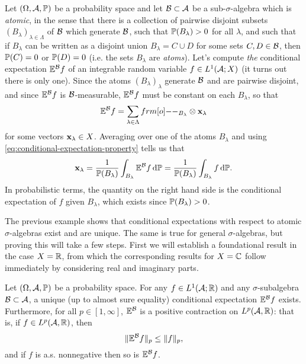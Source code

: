 \begin{example}
  Let $(\Omega,\mc{A},\P)$ be a probability space and let $\mc{B} \subset \mc{A}$ be a sub-$\sigma$-algebra which is \emph{atomic}, in the sense that there is a collection of pairwise disjoint subsets $(B_\lambda)_{\lambda \in \Lambda}$ of $\mc{B}$ which generate $\mc{B}$, such that $\P(B_{\lambda}) > 0$ for all $\lambda$, and such that if $B_\lambda$ can be written as a disjoint union $B_\lambda = C \cup D$ for some sets $C,D \in \mc{B}$, then $\P(C) = 0$ or $\P(D) = 0$ (i.e. the sets $B_\lambda$ are \emph{atoms}).
  Let's compute \emph{the} conditional expectation $\E^{\mc{B}}f$ of an integrable random variable $f \in L^1(\mc{A};X)$ (it turns out there is only one).
  Since the atoms $(B_\lambda)_{\lambda}$ generate $\mc{B}$ and are pairwise disjoint, and since $\E^{\mc{B}}f$ is $\mc{B}$-measurable, $\E^{\mc{B}}f$ must be constant on each $B_\lambda$, so that
  \begin{equation*}
    \E^{\mc{B}} f = \sum_{\lambda \in \Lambda} \1_{B_\lambda} \otimes \mb{x}_\lambda
  \end{equation*}
  for some vectors $\mb{x}_{\lambda} \in X$.
  Averaging over one of the atoms $B_{\lambda}$ and using \eqref{eq:conditional-expectation-property} tells us that
  \begin{equation*}
    \begin{aligned}
      \mb{x}_\lambda = \frac{1}{\P(B_\lambda)} \int_{B_\lambda} \E^{\mc{B}} f \, \dd\P = \frac{1}{\P(B_\lambda)} \int_{B_\lambda} f \, \dd\P.
    \end{aligned}
  \end{equation*}
  In probabilistic terms, the quantity on the right hand side is the conditional expectation of $f$ given $B_\lambda$, which exists since $\P(B_\lambda) > 0$.
\end{example}

The previous example shows that conditional expectations with respect to atomic $\sigma$-algebras exist and are unique.
The same is true for general $\sigma$-algebras, but proving this will take a few steps.
First we will establish a foundational result in the case $X = \R$, from which the corresponding results for $X = \C$ follow immediately by considering real and imaginary parts.

\begin{thm}\label{thm:conditional-expectation-EU}
  Let $(\Omega,\mc{A},\P)$ be a probability space.
  For any $f \in L^1(\mc{A}; \R)$ and any $\sigma$-subalgebra $\mc{B} \subset \mc{A}$, a unique (up to almost sure equality) conditional expectation $\E^{\mc{B}}f$ exists.
  Furthermore, for all $p \in [1,\infty]$, $\E^{\mc{B}}$ is a positive contraction on $L^p(\mc{A},\R)$: that is, if $f \in L^p(\mc{A},\R)$, then
  \begin{equation*}
    \|\E^{\mc{B}}f\|_{p} \leq \|f\|_{p},
  \end{equation*}
  and if $f$ is a.s. nonnegative then so is $\E^{\mc{B}}f$.
\end{thm}

